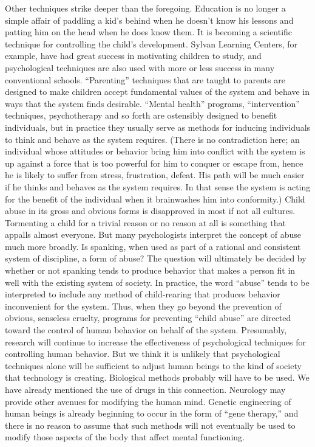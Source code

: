  Other techniques strike deeper than the foregoing. Education is no longer a simple affair of paddling a kid’s behind when he doesn’t know his lessons and patting him on the head when he does know them. It is becoming a scientific technique for controlling the child’s development. Sylvan Learning Centers, for example, have had great success in motivating children to study, and psychological techniques are also used with more or less success in many conventional schools. “Parenting” techniques that are taught to parents are designed to make children accept fundamental values of the system and behave in ways that the system finds desirable. “Mental health” programs, “intervention” techniques, psychotherapy and so forth are ostensibly designed to benefit individuals, but in practice they usually serve as methods for inducing individuals to think and behave as the system requires. (There is no contradiction here; an individual whose attitudes or behavior bring him into conflict with the system is up against a force that is too powerful for him to conquer or escape from, hence he is likely to suffer from stress, frustration, defeat. His path will be much easier if he thinks and behaves as the system requires. In that sense the system is acting for the benefit of the individual when it brainwashes him into conformity.) Child abuse in its gross and obvious forms is disapproved in most if not all cultures. Tormenting a child for a trivial reason or no reason at all is something that appalls almost everyone. But many psychologists interpret the concept of abuse much more broadly. Is spanking, when used as part of a rational and consistent system of discipline, a form of abuse? The question will ultimately be decided by whether or not spanking tends to produce behavior that makes a person fit in well with the existing system of society. In practice, the word “abuse” tends to be interpreted to include any method of child-rearing that produces behavior inconvenient for the system. Thus, when they go beyond the prevention of obvious, senseless cruelty, programs for preventing “child abuse” are directed toward the control of human behavior on behalf of the system.
 Presumably, research will continue to increase the effectiveness of psychological techniques for controlling human behavior. But we think it is unlikely that psychological techniques alone will be sufficient to adjust human beings to the kind of society that technology is creating. Biological methods probably will have to be used. We have already mentioned the use of drugs in this connection. Neurology may provide other avenues for modifying the human mind. Genetic engineering of human beings is already beginning to occur in the form of “gene therapy,” and there is no reason to assume that such methods will not eventually be used to modify those aspects of the body that affect mental functioning.
